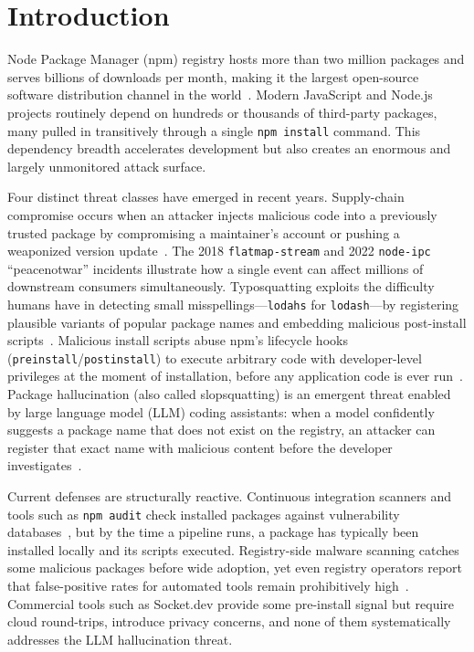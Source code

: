 \documentclass[journal]{IEEEtran}
\begin{document}
\section{Introduction}
 Node Package Manager (npm) registry hosts more than two million packages and serves
billions of downloads per month, making it the largest open-source software distribution channel in the
world~\cite{zimmermann2019}. Modern JavaScript and Node.js projects routinely depend on hundreds or
thousands of third-party packages, many pulled in transitively through a single \texttt{npm install}
command. This dependency breadth accelerates development but also creates an enormous and largely
unmonitored attack surface.

Four distinct threat classes have emerged in recent years. Supply-chain compromise occurs when an
attacker injects malicious code into a previously trusted package by compromising a maintainer's account or
pushing a weaponized version update~\cite{ohm2020,latendresse2022}. The 2018 \texttt{flatmap-stream} and
2022 \texttt{node-ipc} ``peacenotwar'' incidents illustrate how a single event can affect millions of
downstream consumers simultaneously. Typosquatting exploits the difficulty humans have in detecting small
misspellings---\texttt{lodahs} for \texttt{lodash}---by registering plausible variants of popular package
names and embedding malicious post-install scripts~\cite{vu2020}. Malicious install scripts abuse npm's
lifecycle hooks (\texttt{preinstall}/\texttt{postinstall}) to execute arbitrary code with developer-level
privileges at the moment of installation, before any application code is ever run~\cite{duan2021}. Package
hallucination (also called slopsquatting) is an emergent threat enabled by large language model (LLM) coding
assistants: when a model confidently suggests a package name that does not exist on the registry, an
attacker can register that exact name with malicious content before the developer
investigates~\cite{spracklen2025}.

Current defenses are structurally reactive. Continuous integration scanners and tools such as
\texttt{npm audit} check installed packages against vulnerability databases~\cite{zapata2018}, but by the
time a pipeline runs, a package has typically been installed locally and its scripts executed. Registry-side
malware scanning catches some malicious packages before wide adoption, yet even registry operators report
that false-positive rates for automated tools remain prohibitively high~\cite{vu2023}. Commercial tools such
as Socket.dev provide some pre-install signal but require cloud round-trips, introduce privacy concerns, and
none of them systematically addresses the LLM hallucination threat.
\end{document}
